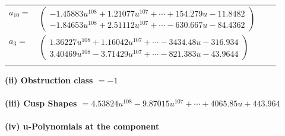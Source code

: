 \documentclass[1p]{elsarticle_modified}
\theoremstyle{definition}
\begin{document}
\begin{tabular}{m{7pt} m{180pt} m{7pt} m{180pt} }
\flushright $a_{10}=$&$\begin{pmatrix}-1.45883 u^{108}+1.21077 u^{107}+\cdots+154.279 u-11.8482\\-1.84653 u^{108}+2.51112 u^{107}+\cdots-630.667 u-84.4362\end{pmatrix}$ \\
\flushright $a_{3}=$&$\begin{pmatrix}1.36227 u^{108}+1.16042 u^{107}+\cdots-3434.48 u-316.934\\3.40469 u^{108}-3.71429 u^{107}+\cdots-821.383 u-43.9644\end{pmatrix}$\\&\end{tabular}
\flushleft \textbf{(ii) Obstruction class $= -1$}\\~\\
\flushleft \textbf{(iii) Cusp Shapes $= 4.53824 u^{108}-9.87015 u^{107}+\cdots+4065.85 u+443.964$}\\~\\
\newpage\renewcommand{\arraystretch}{1}
\flushleft \textbf{(iv) u-Polynomials at the component}\newline \\
\end{document}
